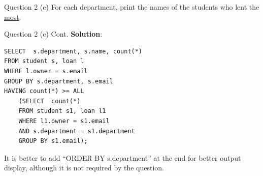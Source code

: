\begin{frame}[fragile]{Question 2 (c)}
For each department, print the names of the students who lent the \underline{most}.
\end{frame}


\begin{frame}[fragile]{Question 2 (c) Cont.}
\textbf{Solution}:
	
\begin{lstlisting}
SELECT  s.department, s.name, count(*)
FROM student s, loan l
WHERE l.owner = s.email
GROUP BY s.department, s.email
HAVING count(*) >= ALL
	(SELECT  count(*) 
	FROM student s1, loan l1
	WHERE l1.owner = s1.email
	AND s.department = s1.department
	GROUP BY s1.email);
\end{lstlisting}\vspace{5pt}

\begin{block}{}
It is better to add ``ORDER BY s.department'' at the end for better output display, although it is not required by the question.	
\end{block}
\end{frame}



